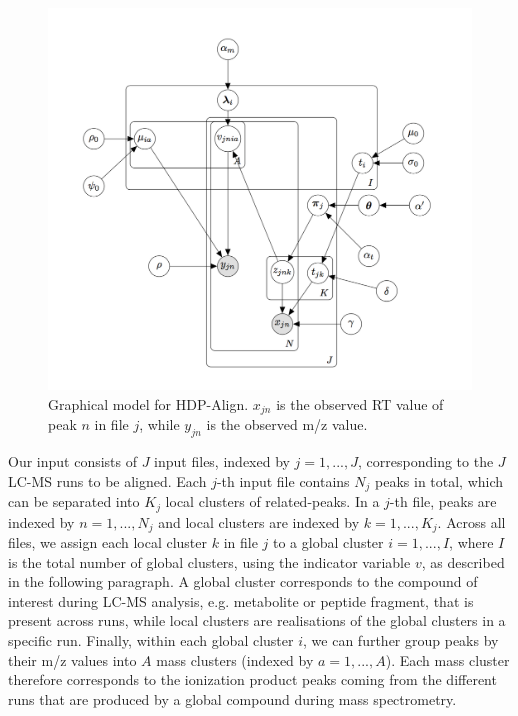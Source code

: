 \begin{figure}[!htbp]
\centering\includegraphics[width=0.9\linewidth]{06-hdp/figures/model_hdp.png}
\centering\caption{Graphical model for HDP-Align. $x_{jn}$ is the observed RT value of peak $n$ in file $j$, while $y_{jn}$ is the observed m/z value.\label{fig-platediagram}}
\end{figure}

Our input consists of $J$ input files, indexed by $j=1,...,J$, corresponding to the $J$ LC-MS runs to be aligned. Each $j$-th input file contains $N_j$ peaks in total, which can be separated into $K_j$ local clusters of related-peaks. In a $j$-th file, peaks are indexed by $n=1,...,N_j$ and local clusters are indexed by $k=1,...,K_j$. Across all files, we assign each local cluster $k$ in file $j$ to a global cluster $i=1,...,I$, where $I$ is the total number of global clusters, using the indicator variable $v$, as described in the following paragraph. A global cluster corresponds to the compound of interest during LC-MS analysis, e.g. metabolite or peptide fragment, that is present across runs, while local clusters are realisations of the global clusters in a specific run. Finally, within each global cluster $i$, we can further group peaks by their m/z values into $A$ mass clusters (indexed by $a=1,...,A$). Each mass cluster therefore corresponds to the ionization product peaks coming from the different runs that are produced by a global compound during mass spectrometry.

